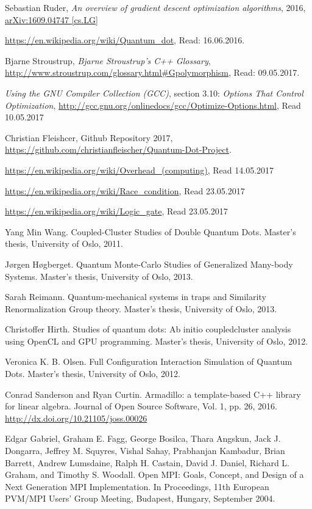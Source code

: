 \documentclass[../main.tex]{subfiles}
\begin{document}
\begin{thebibliography}{99}
 Sebastian Ruder, \emph{An overview of gradient descent optimization
algorithms}, 2016, 	\href{https://arxiv.org/abs/1609.04747}{arXiv:1609.04747 [cs.LG]}

 \url{https://en.wikipedia.org/wiki/Quantum_dot}, Read: 16.06.2016.

 Bjarne Stroustrup, \emph{Bjarne Stroustrup's C++ Glossary},  \url{http://www.stroustrup.com/glossary.html#Gpolymorphism}, Read: 09.05.2017.

 \emph{Using the GNU Compiler Collection (GCC)}, section 3.10: \emph{Options That Control Optimization}, \url{http://gcc.gnu.org/onlinedocs/gcc/Optimize-Options.html}, Read 10.05.2017

 Christian Fleishcer, Github Repository 2017,  \url{https://github.com/christianfleischer/Quantum-Dot-Project}.

 \url{https://en.wikipedia.org/wiki/Overhead_(computing)}, Read 14.05.2017

 \url{https://en.wikipedia.org/wiki/Race_condition}, Read 23.05.2017

 \url{https://en.wikipedia.org/wiki/Logic_gate}, Read 23.05.2017

 Yang Min Wang. Coupled-Cluster Studies of Double Quantum
Dots. Master’s thesis, University of Oslo, 2011.

 Jørgen Høgberget. Quantum Monte-Carlo Studies of Generalized Many-body Systems. 
Master’s thesis, University of Oslo, 2013.

 Sarah Reimann. Quantum-mechanical systems in traps and Similarity Renormalization Group theory. Master’s thesis, University of Oslo, 2013.

 Christoffer Hirth. Studies of quantum dots: Ab initio coupledcluster analysis using OpenCL and GPU programming. Master’s thesis, University of Oslo, 2012.

 Veronica K. B. Olsen. Full Configuration Interaction Simulation of Quantum Dots. Master’s thesis, University of Oslo, 2012.

 Conrad Sanderson and Ryan Curtin. Armadillo: a template-based C++ library for linear algebra. 
Journal of Open Source Software, Vol. 1, pp. 26, 2016. \url{http://dx.doi.org/10.21105/joss.00026}

 Edgar Gabriel, Graham E. Fagg, George Bosilca, Thara Angskun, Jack J. Dongarra, Jeffrey M. Squyres, Vishal Sahay, Prabhanjan Kambadur, Brian Barrett, Andrew Lumsdaine, Ralph H. Castain, David J. Daniel, Richard L. Graham, and Timothy S. Woodall. Open MPI: Goals, Concept, and Design of a Next Generation MPI Implementation. In Proceedings, 11th European PVM/MPI Users' Group Meeting, Budapest, Hungary, September 2004.


\end{thebibliography}
\end{document}
